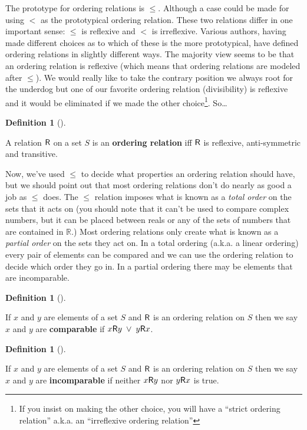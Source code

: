 \documentclass[10pt,]{book}
\newcommand{\terminology}[1]{\textbf{#1}}
\theoremstyle{plain}
\theoremstyle{definition}
\newtheorem{definition}[theorem]{Definition}
\theoremstyle{definition}
\numberwithin{equation}{section}
\newcommand{\Reals}{{\mathbb R}}
\newcommand{\relR}{\mbox{\textsf R}}
\newcommand{\lt}{ < }
\begin{document}
    The prototype for ordering relations is \(\leq\). Although a case
    could be made for using \(\lt\) as the prototypical ordering relation.
    These two relations differ in one important sense: \(\leq\) is reflexive
    and \(\lt\) is irreflexive. Various authors, having made different
    choices as to which of these is the more prototypical, have
    defined ordering relations in slightly different ways. The
    majority view seems to be that an ordering relation is
    reflexive (which means that
    ordering relations are modeled after \(\leq\)).
    We would really like to take the contrary position \textemdash{} we always
    root for the underdog \textemdash{} but one of our favorite ordering
    relation (divisibility) is reflexive and it would be eliminated
    if we made the other choice\footnote{If you insist on making the other 
    choice, you will have a ``strict ordering relation'' a.k.a. an ``irreflexive 
    ordering relation''\label{fn-39}}. So\dots{}
\begin{definition}[{}]\label{definition-11}

        A relation \(\relR\) on a set \(S\) is an
        \terminology{ordering relation}
        iff \(\relR\) is reflexive, anti-symmetric and transitive.
\end{definition}
\par

    Now, we've used \(\leq\) to decide what properties an ordering relation
    should have, but we should point out that most ordering relations
    don't do nearly as good a job as \(\leq\) does. The \(\leq\) relation
    imposes what is known as a \emph{total order}
    on the sets that it acts on (you should note that it can't be used
    to compare complex numbers, but it can be placed between reals or
    any of the sets of numbers that are contained in \(\Reals\).) Most
    ordering relations only create what is known as a 
    \emph{partial order} on the sets they act on. In a total ordering
    (a.k.a. a linear ordering) every pair of elements can be compared
    and we can use the ordering relation to decide which order they go
    in. In a partial ordering there may be elements that are incomparable.
\begin{definition}[{}]\label{definition-12}

        If \(x\) and \(y\) are elements of a set \(S\) and \(\relR\) is an ordering
        relation on \(S\) then we say \(x\) and \(y\) are \terminology{comparable} if
        \(x\relR y \; \lor \; y\relR x\).
\end{definition}
\begin{definition}[{}]\label{definition-13}

        If \(x\) and \(y\) are elements of a set \(S\) and \(\relR\) is an ordering
        relation on \(S\) then we say \(x\) and \(y\) are \terminology{incomparable} if
        neither \(x\relR y\) nor \(y\relR x\) is true.
\end{definition}
\par
\end{document}
